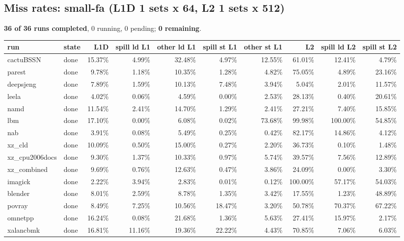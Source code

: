 \documentclass[10pt,a4paper,landscape]{article}
\begin{document}
\subsection*{Miss rates: small-fa (L1D 1 sets x 64, L2 1 sets x 512)}
\textbf{36 of 36 runs completed}, 0 running, 0 pending; \textbf{0 remaining}.\par
{\footnotesize
\begin{longtable}{llrrrrrrrr}
\toprule
run & state & L1D & spill ld L1 & other ld L1 & spill st L1 & other st L1 & L2 & spill ld L2 & spill st L2 \\
\midrule
\endhead
\bottomrule
\endfoot
cactuBSSN & done & 15.37\% & 4.99\% & 32.48\% & 4.97\% & 12.55\% & 61.01\% & 12.41\% & 4.79\% \\
parest & done & 9.78\% & 1.18\% & 10.35\% & 1.28\% & 4.82\% & 75.05\% & 4.89\% & 23.16\% \\
deepsjeng & done & 7.89\% & 1.59\% & 10.13\% & 7.48\% & 3.94\% & 5.04\% & 2.01\% & 11.57\% \\
leela & done & 4.02\% & 0.06\% & 4.59\% & 0.00\% & 2.53\% & 28.13\% & 0.40\% & 20.61\% \\
namd & done & 11.54\% & 2.41\% & 14.70\% & 1.29\% & 2.41\% & 27.21\% & 7.40\% & 15.85\% \\
lbm & done & 17.10\% & 0.00\% & 6.08\% & 0.02\% & 73.68\% & 99.98\% & 100.00\% & 54.85\% \\
nab & done & 3.91\% & 0.08\% & 5.49\% & 0.25\% & 0.42\% & 82.17\% & 14.86\% & 4.12\% \\
xz\_cld & done & 10.09\% & 0.50\% & 15.00\% & 0.27\% & 2.20\% & 36.73\% & 0.10\% & 1.48\% \\
xz\_cpu2006docs & done & 9.30\% & 1.37\% & 10.33\% & 0.97\% & 5.74\% & 39.57\% & 7.56\% & 12.89\% \\
xz\_combined & done & 9.69\% & 0.76\% & 12.63\% & 0.47\% & 3.86\% & 24.09\% & 0.00\% & 3.30\% \\
imagick & done & 2.22\% & 3.94\% & 2.83\% & 0.01\% & 0.12\% & 100.00\% & 57.17\% & 54.03\% \\
blender & done & 8.01\% & 2.59\% & 8.78\% & 1.35\% & 3.42\% & 17.55\% & 1.23\% & 48.89\% \\
povray & done & 8.49\% & 7.25\% & 10.56\% & 18.47\% & 3.20\% & 50.78\% & 70.37\% & 67.22\% \\
omnetpp & done & 16.24\% & 0.08\% & 21.68\% & 1.36\% & 5.63\% & 27.41\% & 15.97\% & 2.17\% \\
xalancbmk & done & 16.81\% & 11.16\% & 19.36\% & 22.22\% & 4.43\% & 70.85\% & 7.06\% & 6.03\% \\

\end{longtable}}
\end{document}
